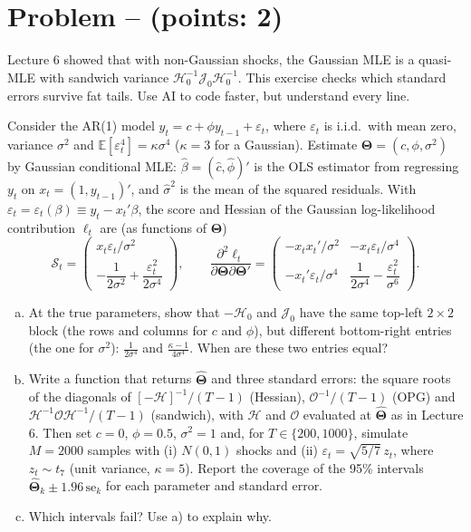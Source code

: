\documentclass[11pt]{article}
\theoremstyle{definition}
\newcommand{\E}{\mathbb{E}}
\newcommand{\symbf}[1]{\boldsymbol{#1}}
\newcounter{problem}
\renewcommand{\theproblem}{\arabic{problem}}
\newcommand{\problem}[1]{
	\stepcounter{problem}
	\section*{Problem \theproblem{} -- (points: #1)}
}
\begin{document}
\problem{2}
Lecture 6 showed that with non-Gaussian shocks, the Gaussian MLE is a quasi-MLE with sandwich variance $\mathcal{H}_0^{-1}\mathcal{J}_0\mathcal{H}_0^{-1}$. This exercise checks which standard errors survive fat tails. Use AI to code faster, but understand every line.

Consider the AR(1) model $y_t = c + \phi y_{t-1} + \varepsilon_t$, where $\varepsilon_t$ is i.i.d.\ with mean zero, variance $\sigma^2$ and $\E[\varepsilon_t^4] = \kappa\sigma^4$ ($\kappa = 3$ for a Gaussian). Estimate $\symbf{\Theta} = (c, \phi, \sigma^2)$ by Gaussian conditional MLE: $\hat\beta = (\hat c, \hat\phi)'$ is the OLS estimator from regressing $y_t$ on $x_t = (1, y_{t-1})'$, and $\hat\sigma^2$ is the mean of the squared residuals. With $\varepsilon_t = \varepsilon_t(\beta) \equiv y_t - x_t'\beta$, the score and Hessian of the Gaussian log-likelihood contribution $\ell_t$ are (as functions of $\symbf{\Theta}$)
\[
	\mathcal{S}_t = \begin{pmatrix} x_t \varepsilon_t/\sigma^2 \\[0.5em] -\dfrac{1}{2\sigma^2} + \dfrac{\varepsilon_t^2}{2\sigma^4} \end{pmatrix}, \qquad
	\frac{\partial^2 \ell_t}{\partial\symbf{\Theta}\partial\symbf{\Theta}'} = \begin{pmatrix} -x_t x_t'/\sigma^2 & -x_t\varepsilon_t/\sigma^4 \\[0.5em] -x_t'\varepsilon_t/\sigma^4 & \dfrac{1}{2\sigma^4} - \dfrac{\varepsilon_t^2}{\sigma^6} \end{pmatrix}.
\]

\begin{enumerate}[a)]
	\item At the true parameters, show that $-\mathcal{H}_0$ and $\mathcal{J}_0$ have the same top-left $2 \times 2$ block (the rows and columns for $c$ and $\phi$), but different bottom-right entries (the one for $\sigma^2$): $\frac{1}{2\sigma^4}$ and $\frac{\kappa - 1}{4\sigma^4}$. When are these two entries equal?


	\item Write a function that returns $\hat{\symbf{\Theta}}$ and three standard errors: the square roots of the diagonals of $[-\mathcal{H}]^{-1}/(T-1)$ (Hessian), $\mathcal{O}^{-1}/(T-1)$ (OPG) and $\mathcal{H}^{-1}\mathcal{O}\mathcal{H}^{-1}/(T-1)$ (sandwich), with $\mathcal{H}$ and $\mathcal{O}$ evaluated at $\hat{\symbf{\Theta}}$ as in Lecture 6. Then set $c = 0$, $\phi = 0.5$, $\sigma^2 = 1$ and, for $T \in \{200, 1000\}$, simulate $M = 2000$ samples with (i) $N(0, 1)$ shocks and (ii) $\varepsilon_t = \sqrt{5/7}\, z_t$, where $z_t \sim t_7$ (unit variance, $\kappa = 5$). Report the coverage of the 95\% intervals $\hat{\symbf{\Theta}}_k \pm 1.96\, \text{se}_k$ for each parameter and standard error.

	\item Which intervals fail? Use a) to explain why.
\end{enumerate}
\end{document}
